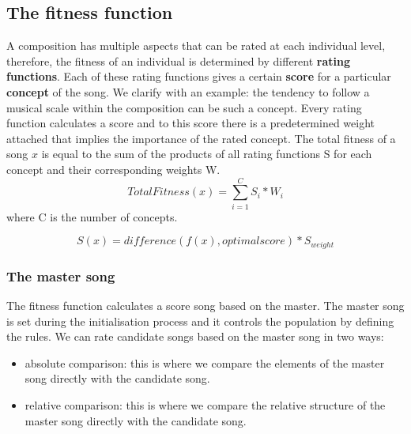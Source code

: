 
\subsection{The fitness function}

A composition has multiple aspects that can be rated at each individual level, therefore, the fitness of an individual is determined by different \textbf{rating functions}. Each of these rating functions gives a certain \textbf{score} for a particular \textbf{concept} of the song. We clarify with an example: the tendency to follow a musical scale within the composition can be such a concept. Every rating function calculates a score and to this score there is a predetermined weight attached that implies the importance of the rated concept. The total fitness of a song $x$ is equal to the sum of the products of all rating functions S for each concept and their corresponding weights W.
\[ TotalFitness(x) = \sum_{i=1}^{C} S_{i} * W_{i}\] 
where C is the number of concepts.


\[ S(x) =  difference( f(x) ,optimalscore) * S_{weight} \]

\subsubsection{The master song}
The fitness function calculates a score song based on the master. The master song is set during the initialisation process and it controls the population by defining the rules. We can rate candidate songs based on the master song in two ways:
\begin{itemize}
    \item absolute comparison: this is where we compare the elements of the master song directly with the candidate song.
    \item relative comparison: this is where we compare the relative structure of the master song directly with the candidate song.
\end{itemize}

